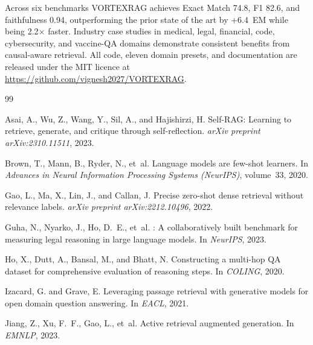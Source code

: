 \documentclass[10pt,twocolumn]{article}
\begin{document}
Across six benchmarks VORTEXRAG achieves Exact Match 74.8, F1 82.6, and
faithfulness 0.94, outperforming the prior state of the art by +6.4~EM while
being 2.2$\times$ faster.  Industry case studies in medical, legal, financial,
code, cybersecurity, and vaccine-QA domains demonstrate consistent benefits
from causal-aware retrieval.  All code, eleven domain presets, and documentation
are released under the MIT licence at
\url{https://github.com/vignesh2027/VORTEXRAG}.


\begin{thebibliography}{99}

Asai, A., Wu, Z., Wang, Y., Sil, A., and Hajishirzi, H.
\newblock Self-{RAG}: Learning to retrieve, generate, and critique through
  self-reflection.
\newblock \emph{arXiv preprint arXiv:2310.11511}, 2023.

Brown, T., Mann, B., Ryder, N., et~al.
\newblock Language models are few-shot learners.
\newblock In \emph{Advances in Neural Information Processing Systems (NeurIPS)},
  volume~33, 2020.

Gao, L., Ma, X., Lin, J., and Callan, J.
\newblock Precise zero-shot dense retrieval without relevance labels.
\newblock \emph{arXiv preprint arXiv:2212.10496}, 2022.

Guha, N., Nyarko, J., Ho, D.~E., et~al.
: A collaboratively built benchmark for measuring legal
  reasoning in large language models.
\newblock In \emph{NeurIPS}, 2023.

Ho, X., Dutt, A., Bansal, M., and Bhatt, N.
\newblock Constructing a multi-hop {QA} dataset for comprehensive evaluation of
  reasoning steps.
\newblock In \emph{COLING}, 2020.

Izacard, G. and Grave, E.
\newblock Leveraging passage retrieval with generative models for open domain
  question answering.
\newblock In \emph{EACL}, 2021.

Jiang, Z., Xu, F.~F., Gao, L., et~al.
\newblock Active retrieval augmented generation.
\newblock In \emph{EMNLP}, 2023.


\end{thebibliography}
\end{document}
